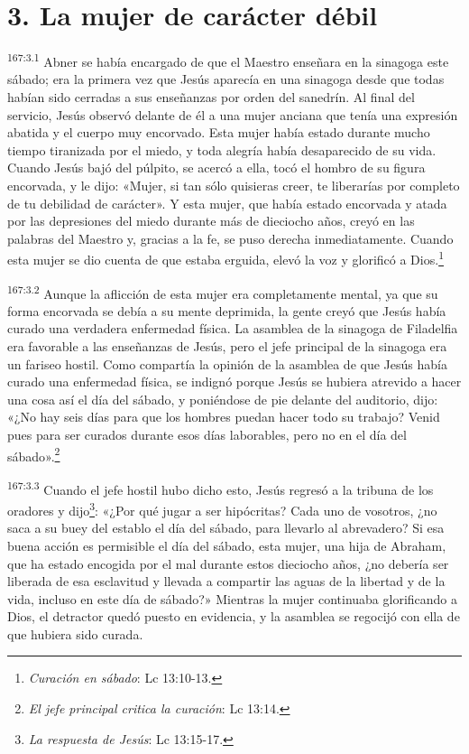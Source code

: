 \section*{3. La mujer de carácter débil}
\par
\textsuperscript{167:3.1} Abner se había encargado de que el Maestro enseñara en la sinagoga este sábado; era la primera vez que Jesús aparecía en una sinagoga desde que todas habían sido cerradas a sus enseñanzas por orden del sanedrín. Al final del servicio, Jesús observó delante de él a una mujer anciana que tenía una expresión abatida y el cuerpo muy encorvado. Esta mujer había estado durante mucho tiempo tiranizada por el miedo, y toda alegría había desaparecido de su vida. Cuando Jesús bajó del púlpito, se acercó a ella, tocó el hombro de su figura encorvada, y le dijo: «Mujer, si tan sólo quisieras creer, te liberarías por completo de tu debilidad de carácter». Y esta mujer, que había estado encorvada y atada por las depresiones del miedo durante más de dieciocho años, creyó en las palabras del Maestro y, gracias a la fe, se puso derecha inmediatamente. Cuando esta mujer se dio cuenta de que estaba erguida, elevó la voz y glorificó a Dios.\footnote{\textit{Curación en sábado}: Lc 13:10-13.}

\par
\textsuperscript{167:3.2} Aunque la aflicción de esta mujer era completamente mental, ya que su forma encorvada se debía a su mente deprimida, la gente creyó que Jesús había curado una verdadera enfermedad física. La asamblea de la sinagoga de Filadelfia era favorable a las enseñanzas de Jesús, pero el jefe principal de la sinagoga era un fariseo hostil. Como compartía la opinión de la asamblea de que Jesús había curado una enfermedad física, se indignó porque Jesús se hubiera atrevido a hacer una cosa así el día del sábado, y poniéndose de pie delante del auditorio, dijo: «¿No hay seis días para que los hombres puedan hacer todo su trabajo? Venid pues para ser curados durante esos días laborables, pero no en el día del sábado».\footnote{\textit{El jefe principal critica la curación}: Lc 13:14.}

\par
\textsuperscript{167:3.3} Cuando el jefe hostil hubo dicho esto, Jesús regresó a la tribuna de los oradores y dijo\footnote{\textit{La respuesta de Jesús}: Lc 13:15-17.}: «¿Por qué jugar a ser hipócritas? Cada uno de vosotros, ¿no saca a su buey del establo el día del sábado, para llevarlo al abrevadero? Si esa buena acción es permisible el día del sábado, esta mujer, una hija de Abraham, que ha estado encogida por el mal durante estos dieciocho años, ¿no debería ser liberada de esa esclavitud y llevada a compartir las aguas de la libertad y de la vida, incluso en este día de sábado?» Mientras la mujer continuaba glorificando a Dios, el detractor quedó puesto en evidencia, y la asamblea se regocijó con ella de que hubiera sido curada.

